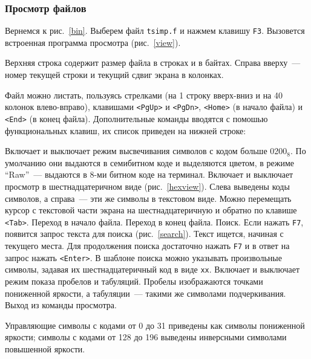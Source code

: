 \subsubsection{Просмотр файлов}

Вернемся к рис.~\ref{bin}. Выберем файл {\tt tsimp.f} и нажмем клавишу {\tt F3}.
Вызовется встроенная программа просмотра (рис.~\ref{view}).


Верхняя строка содержит размер файла в строках и в байтах.
Справа вверху~--- номер текущей строки и
текущий сдвиг экрана в колонках.

Файл можно листать, пользуясь стрелками (на 1 строку вверх-вниз
и на 40 колонок влево-вправо), клавишами {\tt <PgUp>} и {\tt <PgDn>},
{\tt <Home>} (в начало файла) и {\tt <End>} (в конец файла).
Дополнительные команды вводятся с помошью функциональных
клавиш, их список приведен на нижней строке:


\begin{example}
Включает и выключает режим высвечивания символов с кодом больше
0200${}_8$. По умолчанию они выдаются в семибитном коде и выделяются цветом,
в режиме ``Raw''~--- выдаются в 8-ми битном коде на терминал.
Включает и выключает просмотр в шестнадцатеричном виде (рис.~\ref{hexview}).
Слева выведены коды символов, а справа~--- эти же символы в текстовом виде.
Можно перемещать курсор с текстовой
части экрана на шестнадцатеричную и обратно по клавише {\tt <Tab>}.
Переход в начало файла.
Переход в конец файла.
Поиск. Если нажать {\tt F7},
появится запрос текста для поиска (рис.~\ref{search}).
Текст ищется, начиная с текущего места. Для продолжения
поиска достаточно нажать {\tt F7} и в ответ на запрос нажать {\tt <Enter>}.
В шаблоне поиска можно указывать произвольные символы, задавая
их шестнадцатеричный код в виде {\tt \bs xx}.
Включает и выключает режим показа пробелов и табуляций. Пробелы изображаются
точками пониженной яркости, а табуляции~--- такими же символами подчеркивания.
Выход из команды просмотра.
\end{example}


Управляющие символы с кодами от 0 до 31 приведены как символы пониженной
яркости; символы с кодами от 128 до 196 выведены инверсными символами
повышенной яркости.

